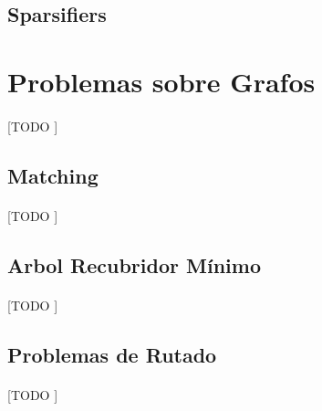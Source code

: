 \documentclass{subfiles}
\begin{document}
        \paragraph{}

      \subsection{Sparsifiers}
      \label{sec:sparsifiers}

        \paragraph{}


    \section{Problemas sobre Grafos}
    \label{sec:graph_problems}

      \paragraph{}
      [TODO ]

      \subsection{Matching}
      \label{sec:graph_matchings}

        \paragraph{}
        [TODO ]

      \subsection{Arbol Recubridor Mínimo}
      \label{sec:minimum_spanning_tree}

        \paragraph{}
        [TODO ]

      \subsection{Problemas de Rutado}
      \label{sec:network_routing}

        \paragraph{}
        [TODO ]
\end{document}
